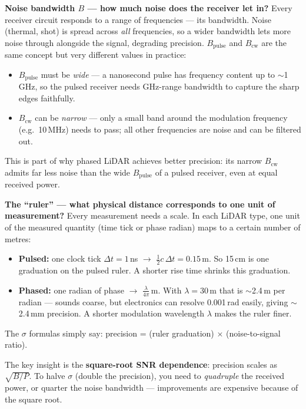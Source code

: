 \documentclass[12pt, a4paper]{article}
\begin{document}
\begin{notebox}
  \textbf{Noise bandwidth $B$ --- how much noise does the receiver let in?}
  Every receiver circuit responds to a range of frequencies --- its bandwidth.
  Noise (thermal, shot) is spread across \emph{all} frequencies, so a wider
  bandwidth lets more noise through alongside the signal, degrading precision.
  $B_\text{pulse}$ and $B_\text{cw}$ are the same concept but very different
  values in practice:
  \begin{itemize}[leftmargin=1.2em,itemsep=2pt]
    \item $B_\text{pulse}$ must be \emph{wide} --- a nanosecond pulse has
      frequency content up to $\sim$1\,GHz, so the pulsed receiver needs
      GHz-range bandwidth to capture the sharp edges faithfully.
    \item $B_\text{cw}$ can be \emph{narrow} --- only a small band around the
      modulation frequency (e.g.\ 10\,MHz) needs to pass; all other
      frequencies are noise and can be filtered out.
  \end{itemize}
  This is part of why phased LiDAR achieves better precision: its narrow
  $B_\text{cw}$ admits far less noise than the wide $B_\text{pulse}$ of a
  pulsed receiver, even at equal received power.

  \textbf{The ``ruler'' --- what physical distance corresponds to one unit of
  measurement?}
  Every measurement needs a scale.  In each LiDAR type, one unit of the
  measured quantity (time tick or phase radian) maps to a certain number of
  metres:
  \begin{itemize}[leftmargin=1.2em,itemsep=2pt]
    \item \textbf{Pulsed:} one clock tick $\Delta t = 1$\,ns
      $\to$ $\tfrac{1}{2}c\,\Delta t = 0.15$\,m.
      So 15\,cm is one graduation on the pulsed ruler.
      A shorter rise time shrinks this graduation.
    \item \textbf{Phased:} one radian of phase
      $\to$ $\tfrac{\lambda}{4\pi}$\,m.
      With $\lambda = 30$\,m that is $\sim$2.4\,m per radian --- sounds
      coarse, but electronics can resolve 0.001\,rad easily, giving
      $\sim$2.4\,mm precision.  A shorter modulation wavelength $\lambda$
      makes the ruler finer.
  \end{itemize}
  The $\sigma$ formulas simply say: precision = (ruler graduation)
  $\times$ (noise-to-signal ratio).


  \vspace{6pt}
  The key insight is the \textbf{square-root SNR dependence}:
  precision scales as $\sqrt{B/P}$.  To halve $\sigma$ (double the
  precision), you need to \emph{quadruple} the received power, or quarter the
  noise bandwidth --- improvements are expensive because of the square root.


\end{notebox}
\end{document}
